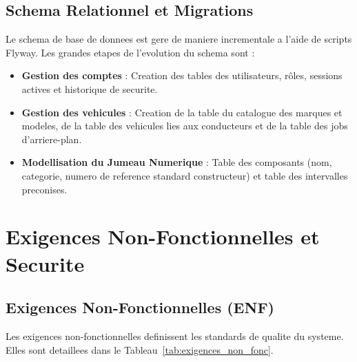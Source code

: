 \documentclass[11pt,a4paper]{report}
\begin{document}
\section{Schema Relationnel et Migrations}
Le schema de base de donnees est gere de maniere incrementale a l'aide de scripts Flyway. Les grandes etapes de l'evolution du schema sont :
\begin{itemize}[label=\textbullet]
    \item \textbf{Gestion des comptes} : Creation des tables des utilisateurs, rôles, sessions actives et historique de securite.
    \item \textbf{Gestion des vehicules} : Creation de la table du catalogue des marques et modeles, de la table des vehicules lies aux conducteurs et de la table des jobs d'arriere-plan.
    \item \textbf{Modellisation du Jumeau Numerique} : Table des composants (nom, categorie, numero de reference standard constructeur) et table des intervalles preconises.
\end{itemize}

\chapter{Exigences Non-Fonctionnelles et Securite}

\section{Exigences Non-Fonctionnelles (ENF)}
Les exigences non-fonctionnelles definissent les standards de qualite du systeme. Elles sont detaillees dans le Tableau~\ref{tab:exigences_non_fonc}.
\end{document}
